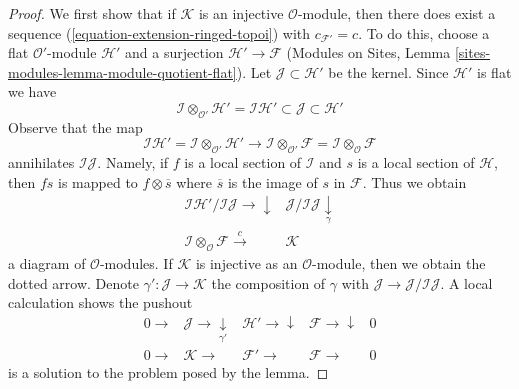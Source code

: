 \begin{proof}

We first show that if $\mathcal{K}$ is an injective $\mathcal{O}$-module,
then there does exist a sequence (\ref{equation-extension-ringed-topoi}) with
$c_{\mathcal{F}'} = c$. To do this, choose a flat
$\mathcal{O}'$-module $\mathcal{H}'$ and a surjection
$\mathcal{H}' \to \mathcal{F}$
(Modules on Sites, Lemma \ref{sites-modules-lemma-module-quotient-flat}).
Let $\mathcal{J} \subset \mathcal{H}'$ be the kernel. Since $\mathcal{H}'$
is flat we have
$$
\mathcal{I} \otimes_{\mathcal{O}'} \mathcal{H}' =
\mathcal{I}\mathcal{H}'
\subset \mathcal{J} \subset \mathcal{H}'
$$
Observe that the map
$$
\mathcal{I}\mathcal{H}' =
\mathcal{I} \otimes_{\mathcal{O}'} \mathcal{H}'
\longrightarrow
\mathcal{I} \otimes_{\mathcal{O}'} \mathcal{F} =
\mathcal{I} \otimes_\mathcal{O} \mathcal{F}
$$
annihilates $\mathcal{I}\mathcal{J}$. Namely, if $f$ is a local section
of $\mathcal{I}$ and $s$ is a local section of $\mathcal{H}$, then
$fs$ is mapped to $f \otimes \overline{s}$ where $\overline{s}$ is
the image of $s$ in $\mathcal{F}$. Thus we obtain
$$
\begin{array}{cc}\mathcal{I}\mathcal{H}'/\mathcal{I}\mathcal{J}
\longrightarrow\downarrow & \mathcal{J}/\mathcal{I}\mathcal{J} \underset{\gamma}{\downarrow} \\ \mathcal{I} \otimes_\mathcal{O} \mathcal{F} \overset{c}{\longrightarrow} & \mathcal{K}\end{array}
$$
a diagram of $\mathcal{O}$-modules. If $\mathcal{K}$ is injective
as an $\mathcal{O}$-module, then we obtain the dotted arrow.
Denote $\gamma' : \mathcal{J} \to \mathcal{K}$ the composition
of $\gamma$ with $\mathcal{J} \to \mathcal{J}/\mathcal{I}\mathcal{J}$.
A local calculation shows the pushout
$$
\begin{array}{ccccc}0 \longrightarrow & \mathcal{J} \longrightarrow\underset{\gamma'}{\downarrow} & \mathcal{H}' \longrightarrow\downarrow & \mathcal{F} \longrightarrow\downarrow & 0 \\ 0 \longrightarrow & \mathcal{K} \longrightarrow & \mathcal{F}' \longrightarrow & \mathcal{F} \longrightarrow & 0\end{array}
$$
is a solution to the problem posed by the lemma.


\end{proof}
